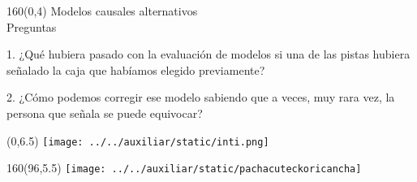 \documentclass[shownotes,aspectratio=169]{beamer}
\begin{document}
\begin{frame}[plain]
\begin{textblock}{160}(0,4)
\centering \LARGE Modelos causales alternativos \\
\Large Preguntas
\end{textblock}
\vspace{1.25cm}

\pause

1. ¿Qué hubiera pasado con la evaluación de modelos si una de las pistas hubiera señalado la caja que habíamos elegido previamente?

\pause
\vspace{0.4cm}

2. ¿Cómo podemos corregir ese modelo sabiendo que a veces, muy rara vez, la persona que señala se puede equivocar?


\end{frame}

\begin{frame}[plain]
\begin{textblock}{96}(0,6.5)\centering
{\texttt{[image: ../../auxiliar/static/inti.png]}}
\end{textblock}

\begin{textblock}{160}(96,5.5)
\texttt{[image: ../../auxiliar/static/pachacuteckoricancha]}
\end{textblock}
\end{frame}
\end{document}
